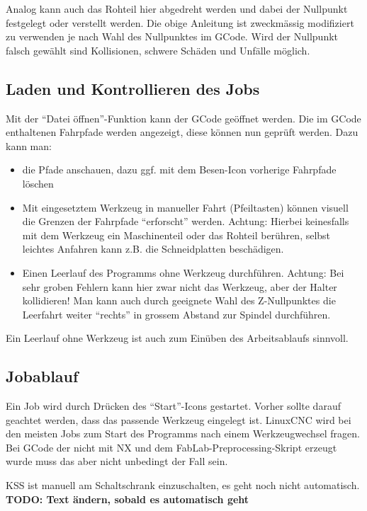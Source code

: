 \documentclass{\basedir/fablab-document}
\newcommand{\todoUnwichtig}[1]{\textbf{TODO: #1} }
\begin{document}

Analog kann auch das Rohteil hier abgedreht werden und dabei der Nullpunkt festgelegt oder verstellt werden. Die obige Anleitung ist zweckmässig modifiziert zu verwenden je nach Wahl des Nullpunktes im GCode. Wird der Nullpunkt falsch gewählt sind Kollisionen, schwere Schäden und Unfälle möglich.

\subsection{Laden und Kontrollieren des Jobs}

Mit der \enquote{Datei öffnen}-Funktion kann der GCode geöffnet werden. Die im GCode enthaltenen Fahrpfade werden angezeigt, diese können nun geprüft werden. Dazu kann man:
\begin{itemize}
	\item die Pfade anschauen, dazu ggf. mit dem Besen-Icon vorherige Fahrpfade löschen
	\item Mit eingesetztem Werkzeug in manueller Fahrt (Pfeiltasten) können visuell die Grenzen der Fahrpfade \enquote{erforscht} werden. Achtung: Hierbei keinesfalls mit dem Werkzeug ein Maschinenteil oder das Rohteil berühren, selbst leichtes Anfahren kann z.B. die Schneidplatten beschädigen.
	\item Einen Leerlauf des Programms ohne Werkzeug durchführen. Achtung: Bei sehr groben Fehlern kann hier zwar nicht das Werkzeug, aber der Halter kollidieren! Man kann auch durch geeignete Wahl des Z-Nullpunktes die Leerfahrt weiter \enquote{rechts} in grossem Abstand zur Spindel durchführen.
\end{itemize}

Ein Leerlauf ohne Werkzeug ist auch zum Einüben des Arbeitsablaufs sinnvoll.

\subsection{Jobablauf}

Ein Job wird durch Drücken des \enquote{Start}-Icons gestartet. Vorher sollte darauf geachtet werden,
dass das passende Werkzeug eingelegt ist. LinuxCNC wird bei den meisten Jobs zum Start des Programms nach einem Werkzeugwechsel fragen. Bei GCode der nicht mit NX und dem FabLab-Preprocessing-Skript erzeugt wurde muss das aber nicht unbedingt der Fall sein.

KSS ist manuell am Schaltschrank einzuschalten, es geht noch nicht automatisch.
\todoUnwichtig{Text ändern, sobald es automatisch geht}
\end{document}
